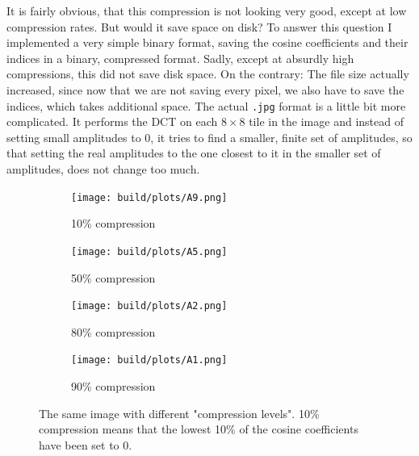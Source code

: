 It is fairly obvious, that this compression is not looking very good, except at low compression rates.
But would it save space on disk? To answer this question I implemented a very simple binary format,
saving the cosine coefficients and their indices in a binary, compressed format. Sadly, except
at absurdly high compressions, this did not save disk space.
On the contrary: The file size actually increased, since now that we are not saving every
pixel, we also have to save the indices, which takes additional space.
The actual \texttt{.jpg} format is a little bit more complicated.
It performs the DCT on each $8\times 8$ tile in the image and instead of
setting small amplitudes to 0, it tries to find a smaller, finite set of amplitudes,
so that setting the real amplitudes to the one closest to it in the smaller set of amplitudes, does
not change too much.
\begin{figure}[htbp]
    \centering
    \begin{subfigure}[h]{.49\linewidth}
        \centering
        \texttt{[image: build/plots/A9.png]}
        \caption{10\% compression}
    \end{subfigure}
    \begin{subfigure}[h]{.49\linewidth}
        \centering
        \texttt{[image: build/plots/A5.png]}
        \caption{50\% compression}
    \end{subfigure}
    \begin{subfigure}[h]{.49\linewidth}
        \centering
        \texttt{[image: build/plots/A2.png]}
        \caption{80\% compression}
    \end{subfigure}
    \begin{subfigure}[h]{.49\linewidth}
        \centering
        \texttt{[image: build/plots/A1.png]}
        \caption{90\% compression}
    \end{subfigure}
    \caption{The same image with different "compression levels". 10\% compression means that the lowest 10\% of the
        cosine coefficients have been set to 0.}
    \label{fig:compr}
\end{figure}